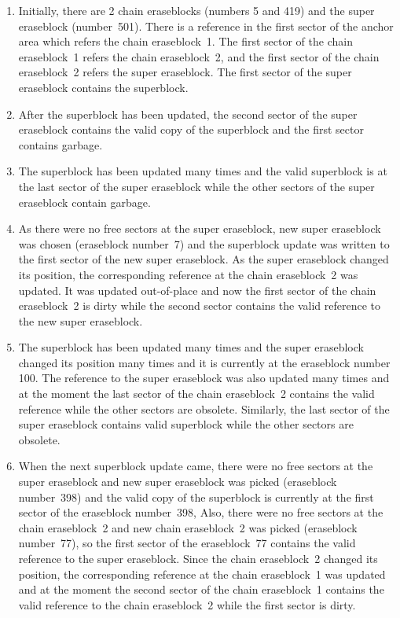 \begin{enumerate}

\item Initially, there are 2 chain eraseblocks (numbers 5 and 419) and the super
eraseblock (number~501). There is a reference in the first sector of the anchor
area which refers the chain eraseblock~1. The first sector of the chain
eraseblock~1 refers the chain eraseblock~2, and the first sector of the chain
eraseblock~2 refers the super eraseblock. The first sector of the super
eraseblock contains the superblock.

\item After the superblock has been updated, the second sector of the super
eraseblock contains the valid copy of the superblock and the first sector
contains garbage.

\item The superblock has been updated many times and the valid superblock is at
the last sector of the super eraseblock while the other sectors of the super
eraseblock contain garbage.

\item As there were no free sectors at the super eraseblock, new super
eraseblock was chosen (eraseblock number~7) and the superblock update was
written to the first sector of the new super eraseblock. As the super
eraseblock changed its position, the corresponding reference at the chain
eraseblock~2 was updated. It was updated \mbox{out-of-place} and now the first
sector of the chain eraseblock~2 is dirty while the second sector contains the
valid reference to the new super eraseblock.

\item The superblock has been updated many times and the super eraseblock
changed its position many times and it is currently at the eraseblock number
100. The reference to the super eraseblock was also updated many times and at
the moment the last sector of the chain eraseblock~2 contains the valid
reference while the other sectors are obsolete. Similarly, the last sector of
the super eraseblock contains valid superblock while the other sectors are
obsolete.

\item When the next superblock update came, there were no free sectors at the
super eraseblock and new super eraseblock was picked (eraseblock number~398)
and the valid copy of the superblock is currently at the first sector of the
eraseblock number~398, Also, there were no free sectors at the chain
eraseblock~2 and new chain eraseblock~2 was picked (eraseblock number~77), so
the first sector of the eraseblock~77 contains the valid reference to the super
eraseblock. Since the chain eraseblock~2 changed its position, the
corresponding reference at the chain eraseblock~1 was updated and at the moment
the second sector of the chain eraseblock~1 contains the valid reference to the
chain eraseblock~2 while the first sector is dirty.


\end{enumerate}

